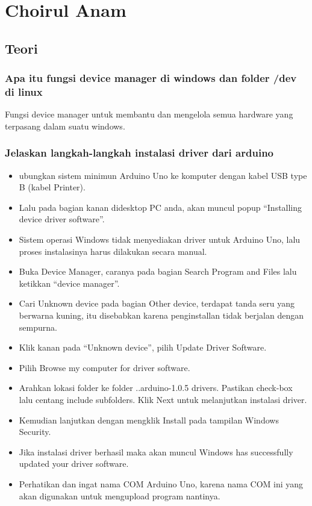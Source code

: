 \section{Choirul Anam}
\subsection{Teori}
\subsubsection{Apa itu fungsi device manager di windows dan folder /dev di linux}
Fungsi device manager untuk membantu dan mengelola semua hardware yang terpasang dalam suatu windows.

\subsubsection{Jelaskan langkah-langkah instalasi driver dari arduino}
\begin{itemize}
    \item ubungkan sistem minimun Arduino Uno ke komputer dengan kabel USB type B (kabel Printer).
    \item Lalu pada bagian kanan didesktop PC anda, akan muncul popup “Installing device driver software”.
	\item Sistem operasi Windows tidak menyediakan driver untuk Arduino Uno, lalu proses instalasinya harus dilakukan secara manual.
	\item Buka Device Manager, caranya pada bagian Search Program and Files lalu ketikkan “device manager”.
	\item Cari Unknown device pada bagian Other device, terdapat tanda seru yang berwarna kuning, itu disebabkan karena penginstallan tidak berjalan dengan sempurna.
	\item Klik kanan pada “Unknown device”, pilih Update Driver Software.
    \item Pilih Browse my computer for driver software.
	\item Arahkan lokasi folder ke folder ..arduino-1.0.5 drivers. Pastikan check-box lalu centang include subfolders. Klik Next untuk melanjutkan instalasi driver.
	\item Kemudian lanjutkan dengan mengklik Install pada tampilan Windows Security.
	\item Jika instalasi driver berhasil maka akan muncul Windows has successfully updated your driver software.
	\item Perhatikan dan ingat nama COM Arduino Uno, karena nama COM ini yang akan digunakan untuk mengupload program nantinya.
\end{itemize}

